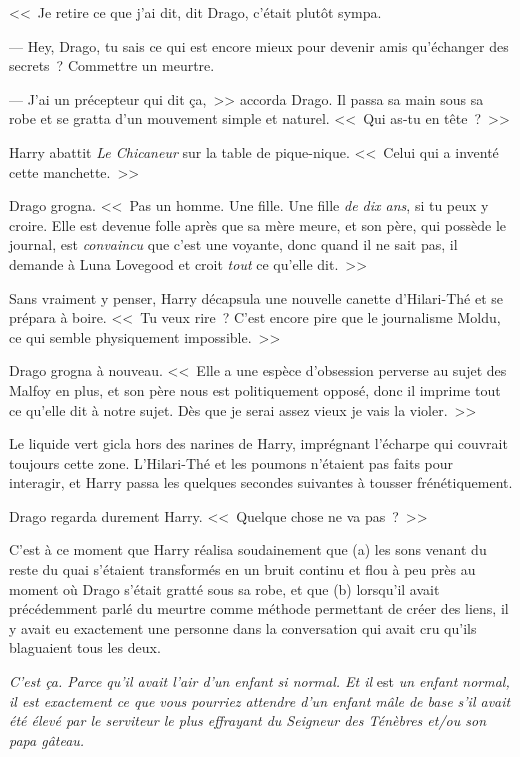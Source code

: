 <<~Je retire ce que j'ai dit, dit Drago, c'était plutôt sympa.

--- Hey, Drago, tu sais ce qui est encore mieux pour devenir amis qu'échanger des secrets~? Commettre un meurtre.

--- J'ai un précepteur qui dit ça,~>> accorda Drago. Il passa sa main sous sa robe et se gratta d'un mouvement simple et naturel. <<~Qui as-tu en tête~?~>>

Harry abattit \emph{Le Chicaneur} sur la table de pique-nique. <<~Celui qui a inventé cette manchette.~>>

Drago grogna. <<~Pas un homme. Une fille. Une fille \emph{de dix ans}, si tu peux y croire. Elle est devenue folle après que sa mère meure, et son père, qui possède le journal, est \emph{convaincu} que c'est une voyante, donc quand il ne sait pas, il demande à Luna Lovegood et croit \emph{tout} ce qu'elle dit.~>>

Sans vraiment y penser, Harry décapsula une nouvelle canette d'Hilari-Thé et se prépara à boire. <<~Tu veux rire~? C'est encore pire que le journalisme Moldu, ce qui semble physiquement impossible.~>>

Drago grogna à nouveau. <<~Elle a une espèce d'obsession perverse au sujet des Malfoy en plus, et son père nous est politiquement opposé, donc il imprime tout ce qu'elle dit à notre sujet. Dès que je serai assez vieux je vais la violer.~>>

Le liquide vert gicla hors des narines de Harry, imprégnant l'écharpe qui couvrait toujours cette zone. L'Hilari-Thé et les poumons n'étaient pas faits pour interagir, et Harry passa les quelques secondes suivantes à tousser frénétiquement.

Drago regarda durement Harry. <<~Quelque chose ne va pas~?~>>

C'est à ce moment que Harry réalisa soudainement que (a) les sons venant du reste du quai s'étaient transformés en un bruit continu et flou à peu près au moment où Drago s'était gratté sous sa robe, et que (b) lorsqu'il avait précédemment parlé du meurtre comme méthode permettant de créer des liens, il y avait eu exactement une personne dans la conversation qui avait cru qu'ils blaguaient tous les deux.

\emph{C'est ça. Parce qu'il avait l'air d'un enfant si normal. Et il} est \emph{un enfant normal, il est exactement ce que vous pourriez attendre d'un enfant mâle de base s'il avait été élevé par le serviteur le plus effrayant du Seigneur des Ténèbres et/ou son papa gâteau.}

